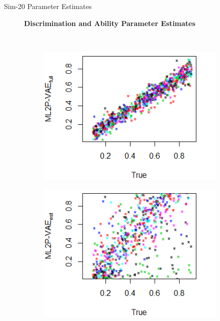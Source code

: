 \documentclass{beamer}
\theoremstyle{definition}
\newcommand*{\figuretitle}[1]{
  {\centering\scriptsize{
  \textbf{#1}
  \par\medskip}}
}
\begin{document}
\begin{frame}{Sim-20 Parameter Estimates}
\begin{figure}[h]
\centering
\figuretitle{Discrimination and Ability Parameter Estimates}\\
    \begin{subfigure}{.32\textwidth}
      \centering
      \includegraphics[width=.9\linewidth]{../img/ml_journal_results/20skills/vae_full_disc_20skills.png}
    \end{subfigure}
    \begin{subfigure}{.32\textwidth}
      \centering
      \includegraphics[width=.9\linewidth]{../img/ml_journal_results/20skills/vae_est_disc_20skills.png}
    \end{subfigure}
    \begin{subfigure}{.32\textwidth}
      \centering

\end{subfigure}
\end{figure}
\end{frame}
\end{document}
